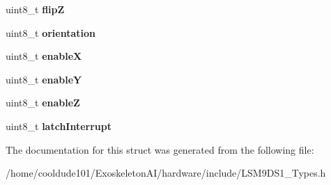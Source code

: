 \begin{DoxyCompactItemize}
\item 
uint8\+\_\+t {\bfseries flipZ}\hypertarget{structgyroSettings_a94c92be9f7c56dd9cd21120307d7373f}{}\label{structgyroSettings_a94c92be9f7c56dd9cd21120307d7373f}

\item 
uint8\+\_\+t {\bfseries orientation}\hypertarget{structgyroSettings_a33239fd5c4a0fd74670455008c2701ee}{}\label{structgyroSettings_a33239fd5c4a0fd74670455008c2701ee}

\item 
uint8\+\_\+t {\bfseries enableX}\hypertarget{structgyroSettings_a7c1000d1151579743faa376d49751f1d}{}\label{structgyroSettings_a7c1000d1151579743faa376d49751f1d}

\item 
uint8\+\_\+t {\bfseries enableY}\hypertarget{structgyroSettings_a4d6ea95b7a52daab6d48dc128c83f3d8}{}\label{structgyroSettings_a4d6ea95b7a52daab6d48dc128c83f3d8}

\item 
uint8\+\_\+t {\bfseries enableZ}\hypertarget{structgyroSettings_a86a86182fd841bd651672d43803b5c63}{}\label{structgyroSettings_a86a86182fd841bd651672d43803b5c63}

\item 
uint8\+\_\+t {\bfseries latch\+Interrupt}\hypertarget{structgyroSettings_a3eb9f52cae013b107fbc5059220f9333}{}\label{structgyroSettings_a3eb9f52cae013b107fbc5059220f9333}

\end{DoxyCompactItemize}


The documentation for this struct was generated from the following file\+:\begin{DoxyCompactItemize}
\item 
/home/cooldude101/\+Exoskeleton\+A\+I/hardware/include/L\+S\+M9\+D\+S1\+\_\+\+Types.\+h\end{DoxyCompactItemize}
